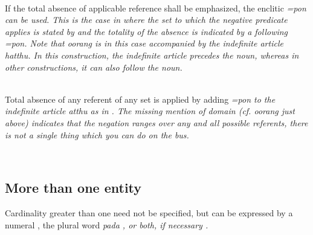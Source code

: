 \\

If the total absence of applicable reference shall be emphasized, the enclitic \em =pon \em can be used.
This is the case in  where the set to which the negative predicate applies is stated by  and the totality of the absence is indicated by a following \em =pon\em. Note that \em oorang \em is in this case accompanied by the indefinite article \em hatthu\em. In this construction, the indefinite article precedes the noun, whereas in other constructions, it can also follow the noun.

\\

Total absence of any referent of any set is applied by adding \em =pon \em to the indefinite article \em atthu \em as in . The missing mention of domain (cf. \em oorang \em just above) indicates that the negation ranges over any and all possible referents, there is not a single thing which you can do on the bus.

 \\
\subsection{More than one entity}\label{sec:func:Morethanoneentity}
Cardinality greater than one need not be specified, but can be expressed by a numeral , the plural word \em pada \em {}, or both, if necessary .

\\



